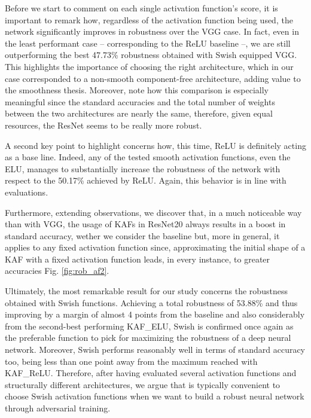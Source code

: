 \documentclass[LaM,binding=0.6cm]{./packages/sapthesis/sapthesis}
\begin{document}
        Before we start to comment on each single activation function's score, it is important to remark how, regardless of the 
        activation function being used, the network significantly improves in robustness over the VGG case. In fact, even in the least 
        performant case -- corresponding to the ReLU baseline --, we are still outperforming the best 47.73\% robustness obtained
        with Swish equipped VGG. This highlights the importance of choosing the right architecture, which in our case corresponded to 
        a non-smooth component-free architecture, adding value to the smoothness thesis. Moreover, note how this comparison is especially
        meaningful since the standard accuracies and the total number of weights between the two architectures are nearly the same, therefore,
        given equal resources, the ResNet seems to be really more robust.

        A second key point to highlight concerns how, this time, ReLU is definitely acting as a base line.
        Indeed, any of the tested smooth activation functions, even the ELU, manages to substantially 
        increase the robustness of the network with respect to the 50.17\% achieved by ReLU. Again, 
        this behavior is in line with \cite{smooth_adversarial_training} evaluations. 
        
        Furthermore, extending \cite{smooth_adversarial_training}
        observations, we discover that, in a much noticeable way than with VGG, the usage of KAFs 
        in ResNet20 always results in a boost in standard accuracy, wether we consider the baseline 
        but, more in general, it applies to any fixed activation function since, approximating the  
        initial shape of a KAF with a fixed activation function leads, in every instance, to greater 
        accuracies Fig. \ref{fig:rob_af2}.

        Ultimately, the most remarkable result for our study concerns the robustness obtained 
        with Swish functions. Achieving a total robustness of 53.88\% and thus improving 
        by a margin of almost 4 points from the baseline and also considerably from the second-best performing KAF\_ELU, Swish is confirmed once again as the 
        preferable function to pick for maximizing the robustness of a deep neural network. 
        Moreover, Swish performs reasonably well in terms of standard accuracy too, being less than one point away 
        from the maximum reached with KAF\_ReLU. Therefore, after having evaluated several activation 
        functions and structurally different architectures, we argue that is typically convenient to 
        choose Swish activation functions when we want to build a robust neural network through adversarial training.
\end{document}
